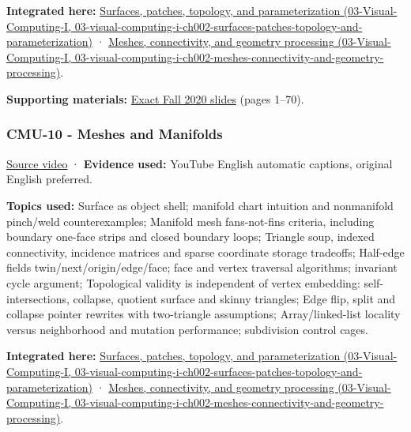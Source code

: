 \textbf{Integrated here:} \href{../03-Visual-Computing-I/main.pdf\#nameddest=03-visual-computing-i-ch002-surfaces-patches-topology-and-parameterization}{Surfaces, patches, topology, and parameterization (03-Visual-Computing-I, 03-visual-computing-i-ch002-surfaces-patches-topology-and-parameterization)} · \href{../03-Visual-Computing-I/main.pdf\#nameddest=03-visual-computing-i-ch002-meshes-connectivity-and-geometry-processing}{Meshes, connectivity, and geometry processing (03-Visual-Computing-I, 03-visual-computing-i-ch002-meshes-connectivity-and-geometry-processing)}.

\textbf{Supporting materials:} \href{https://15462.courses.cs.cmu.edu/fall2020content/lectures/09_introgeometry/09_introgeometry_slides.pdf}{Exact Fall 2020 slides} (pages 1--70).

\subsubsection{CMU-10 - Meshes and Manifolds}\label{04-visual-computing-ii-ch036-cmu-10---meshes-and-manifolds}

\href{https://www.youtube.com/watch?v=HePDHsp8spU}{Source video} · \textbf{Evidence used:} YouTube English automatic captions, original English preferred.

\textbf{Topics used:} Surface as object shell; manifold chart intuition and nonmanifold pinch/weld counterexamples; Manifold mesh fans-not-fins criteria, including boundary one-face strips and closed boundary loops; Triangle soup, indexed connectivity, incidence matrices and sparse coordinate storage tradeoffs; Half-edge fields twin/next/origin/edge/face; face and vertex traversal algorithms; invariant cycle argument; Topological validity is independent of vertex embedding: self-intersections, collapse, quotient surface and skinny triangles; Edge flip, split and collapse pointer rewrites with two-triangle assumptions; Array/linked-list locality versus neighborhood and mutation performance; subdivision control cages.

\textbf{Integrated here:} \href{../03-Visual-Computing-I/main.pdf\#nameddest=03-visual-computing-i-ch002-surfaces-patches-topology-and-parameterization}{Surfaces, patches, topology, and parameterization (03-Visual-Computing-I, 03-visual-computing-i-ch002-surfaces-patches-topology-and-parameterization)} · \href{../03-Visual-Computing-I/main.pdf\#nameddest=03-visual-computing-i-ch002-meshes-connectivity-and-geometry-processing}{Meshes, connectivity, and geometry processing (03-Visual-Computing-I, 03-visual-computing-i-ch002-meshes-connectivity-and-geometry-processing)}.

